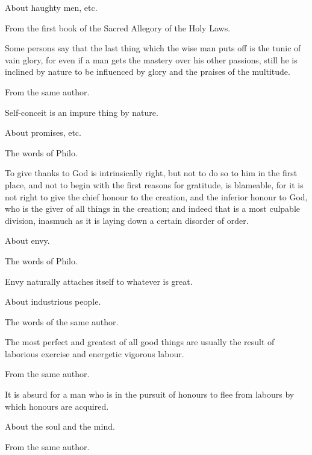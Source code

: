 About haughty men, etc.

From the first book of the Sacred Allegory of the Holy Laws.

Some persons say that the last thing which the wise man puts off is the tunic of vain glory, for even
if a man gets the mastery over his other passions, still he is inclined by nature to be influenced by
glory and the praises of the multitude.

From the same author.

Self-conceit is an impure thing by nature.

About promises, etc.

The words of Philo.

To give thanks to God is intrinsically right, but not to do so to him in the first place, and not to begin
with the first reasons for gratitude, is blameable, for it is not right to give the chief honour to the
creation, and the inferior honour to God, who is the giver of all things in the creation; and indeed
that is a most culpable division, inasmuch as it is laying down a certain disorder of order.

About envy.

The words of Philo.

Envy naturally attaches itself to whatever is great.

About industrious people.

The words of the same author.

The most perfect and greatest of all good things are usually the result of laborious exercise and
energetic vigorous labour.

From the same author.

It is absurd for a man who is in the pursuit of honours to flee from labours by which honours are
acquired.

About the soul and the mind.

From the same author.

